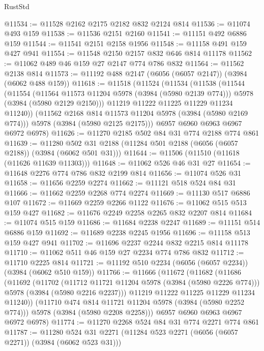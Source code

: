 \begin{lexlean}{RustStd}
\begin{coremodule}
@11534 := @11528 @2162 @2175 @2182 @832 @2124 @814
@11536 := @11074 @493 @159
@11538 := @11536 @2151 @2160
@11541 := @11151 @492 @6886 @159
@11544 := @11541 @2151 @2158 @1956
@11548 := @11158 @491 @159 @427 @941
@11554 := @11548 @2150 @2157 @832 @646 @814 @11178
@11562 := @11062 @489 @46 @159 @27 @2147 @774 @786 @832
@11564 := @11562 @2138 @814
@11573 := @11192 @488 @2147 (@6056 (@6057 @2147)) (@3984 (@6062 @488 @159))
@11618 := @11518
    (@11524
      (@11534
        (@11538
          (@11544
            (@11554
              (@11564 @11573 @11204 @5978 (@3984 (@5980 @2139 @774)))
              @5978
              (@3984 (@5980 @2129 @2150)))
            @11219
            @11222
            @11225
            @11229
            @11234
            @11240))
        (@11562 @2168 @814 @11573 @11204 @5978 (@3984 (@5980 @2169 @774)))
        @5978
        (@3984 (@5980 @2125 @2175)))
      @6957
      @6960
      @6963
      @6967
      @6972
      @6978)
@11626 := @11270 @2185 @502 @84 @31 @774 @2188 @774 @861
@11639 := @11280 @502 @31 @2188 (@11284 @501 @2188 (@6056 (@6057 @2188)) (@3984 (@6062 @501 @31)))
@11644 := @11506 (@11510 (@11618 (@11626 @11639 @11303)))
@11648 := @11062 @526 @46 @31 @27
@11654 := @11648 @2276 @774 @786 @832 @2199 @814
@11656 := @11074 @526 @31
@11658 := @11656 @2259 @2274
@11662 := @11121 @518 @524 @84 @31
@11666 := @11662 @2259 @2268 @774 @2274
@11669 := @11130 @517 @6886 @107
@11672 := @11669 @2259 @2266 @1122
@11676 := @11062 @515 @513 @159 @427
@11682 := @11676 @2249 @2258 @2265 @832 @2207 @814
@11684 := @11074 @515 @159
@11686 := @11684 @2238 @2247
@11689 := @11151 @514 @6886 @159
@11692 := @11689 @2238 @2245 @1956
@11696 := @11158 @513 @159 @427 @941
@11702 := @11696 @2237 @2244 @832 @2215 @814 @11178
@11710 := @11062 @511 @46 @159 @27 @2234 @774 @786 @832
@11712 := @11710 @2225 @814
@11721 := @11192 @510 @2234 (@6056 (@6057 @2234)) (@3984 (@6062 @510 @159))
@11766 := @11666
    (@11672
      (@11682
        (@11686
          (@11692
            (@11702
              (@11712 @11721 @11204 @5978 (@3984 (@5980 @2226 @774)))
              @5978
              (@3984 (@5980 @2216 @2237)))
            @11219
            @11222
            @11225
            @11229
            @11234
            @11240))
        (@11710 @474 @814 @11721 @11204 @5978 (@3984 (@5980 @2252 @774)))
        @5978
        (@3984 (@5980 @2208 @2258)))
      @6957
      @6960
      @6963
      @6967
      @6972
      @6978)
@11774 := @11270 @2268 @524 @84 @31 @774 @2271 @774 @861
@11787 := @11280 @524 @31 @2271 (@11284 @523 @2271 (@6056 (@6057 @2271)) (@3984 (@6062 @523 @31)))

\end{coremodule}
\end{lexlean}
